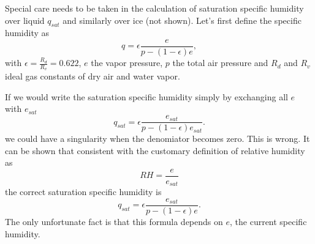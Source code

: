 Special care needs to be taken in the calculation of saturation specific humidity 
over liquid $q_{sat}$ and similarly over ice (not shown).  Let's first define the specific humidity as
\begin{equation}
q = \epsilon \frac{e}{p-(1-\epsilon)e} ,
\end{equation}
with $\epsilon=\frac{R_d}{R_v}=0.622$, $e$ the vapor pressure, $p$ the total air pressure and 
$R_d$ and $R_v$ ideal gas constants of dry air and water vapor.

If we would write the saturation specific humidity simply by exchanging all $e$ with $e_{sat}$ 
\begin{equation}
q_{sat} = \epsilon \frac{e_{sat}}{p-(1-\epsilon)e_{sat}}.
\end{equation}
we could have a singularity when the denomiator becomes zero.  This is wrong.  It can be shown 
that consistent with the customary definition of relative humidity as
\begin{equation}
RH = \frac{e}{e_{sat}}
\end{equation}
the correct saturation specific humidity is
\begin{equation}
q_{sat} = \epsilon \frac{e_{sat}}{p-(1-\epsilon)e}.
\end{equation}
The only unfortunate fact is that this formula depends on $e$, the current specific humidity. 





